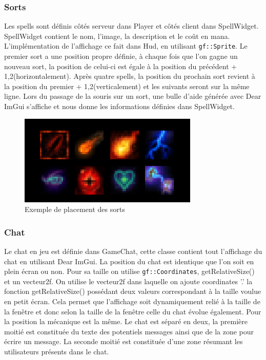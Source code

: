 \documentclass[a4paper, 12pt, twoside]{article}
\begin{document}
\subsubsection{Sorts}
Les spells sont définis côtés serveur dans Player et côtés client dans SpellWidget. SpellWidget contient le nom, l'image, la description et le coût en mana.  L'implémentation de l'affichage ce fait dans Hud, en utilisant \verb!gf::Sprite!. Le premier sort a une position propre définie, à chaque fois que l'on gagne un nouveau sort, la position de celui-ci est égale à la position du précédent + 1,2(horizontalement). Après quatre spells, la position du prochain sort revient à la position du premier + 1,2(verticalement) et les suivants seront sur la même ligne.
Lors du passage de la souris sur un sort, une bulle d'aide générée avec Dear ImGui s'affiche et nous donne les informations définies dans SpellWidget.
\begin{figure}[H]
    \begin{center}
    \includegraphics[scale=0.5]{./GraphiqueInGame/Spells}
    \caption{Exemple de placement des sorts}
    \end{center}
\end{figure}

\subsubsection{Chat}
Le chat en jeu est définie dans GameChat, cette classe contient tout l'affichage du chat en utilisant Dear ImGui. La position du chat est identique que l'on soit en plein écran ou non. Pour sa taille on utilise \verb!gf::Coordinates!, getRelativeSize() et un vecteur2f. On utilise le vecteur2f dans laquelle on ajoute coordinates '.' la fonction getRelativeSize() possédant deux valeurs correspondant à la taille voulue en petit écran. Cela permet que l'affichage soit dynamiquement relié à la taille de la fenêtre et donc selon la taille de la fenêtre celle du chat évolue également. Pour la position la mécanique est la même.
Le chat est séparé en deux, la première moitié est constituée du texte des potentiels messages ainsi que de la zone pour écrire un message. La seconde moitié est constituée d'une zone résumant les utilisateurs présents dans le chat.
\end{document}
